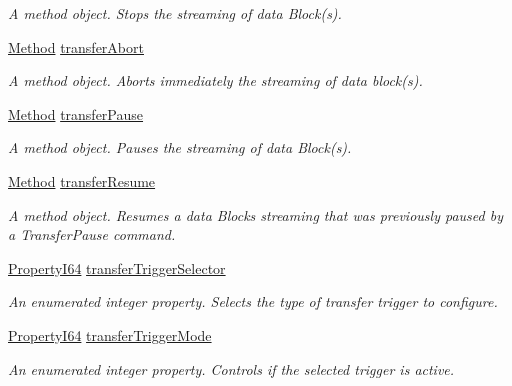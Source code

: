 \begin{DoxyCompactItemize}
\begin{DoxyCompactList}\small\item\em A method object. Stops the streaming of data Block(s). \end{DoxyCompactList}\item 
\hyperlink{classmv_i_m_p_a_c_t_1_1acquire_1_1_method}{Method} \hyperlink{classmv_i_m_p_a_c_t_1_1acquire_1_1_gen_i_cam_1_1_transfer_control_a0ed5e49de005396a48a227df364ae216}{transfer\+Abort}
\begin{DoxyCompactList}\small\item\em A method object. Aborts immediately the streaming of data block(s). \end{DoxyCompactList}\item 
\hyperlink{classmv_i_m_p_a_c_t_1_1acquire_1_1_method}{Method} \hyperlink{classmv_i_m_p_a_c_t_1_1acquire_1_1_gen_i_cam_1_1_transfer_control_a963353ae0411e4e5ab0bd08b4dbf7eae}{transfer\+Pause}
\begin{DoxyCompactList}\small\item\em A method object. Pauses the streaming of data Block(s). \end{DoxyCompactList}\item 
\hyperlink{classmv_i_m_p_a_c_t_1_1acquire_1_1_method}{Method} \hyperlink{classmv_i_m_p_a_c_t_1_1acquire_1_1_gen_i_cam_1_1_transfer_control_a6077208508f7c213308cdfc89ddc9152}{transfer\+Resume}
\begin{DoxyCompactList}\small\item\em A method object. Resumes a data Blocks streaming that was previously paused by a Transfer\+Pause command. \end{DoxyCompactList}\item 
\hyperlink{group___common_interface_ga81749b2696755513663492664a18a893}{Property\+I64} \hyperlink{classmv_i_m_p_a_c_t_1_1acquire_1_1_gen_i_cam_1_1_transfer_control_a7e49e86aa9d74e5a9b94b55f67e2d3dc}{transfer\+Trigger\+Selector}
\begin{DoxyCompactList}\small\item\em An enumerated integer property. Selects the type of transfer trigger to configure. \end{DoxyCompactList}\item 
\hyperlink{group___common_interface_ga81749b2696755513663492664a18a893}{Property\+I64} \hyperlink{classmv_i_m_p_a_c_t_1_1acquire_1_1_gen_i_cam_1_1_transfer_control_ac2953e7216e702179e8277aa4355ba31}{transfer\+Trigger\+Mode}
\begin{DoxyCompactList}\small\item\em An enumerated integer property. Controls if the selected trigger is active. \end{DoxyCompactList}\item 

\end{DoxyCompactItemize}
